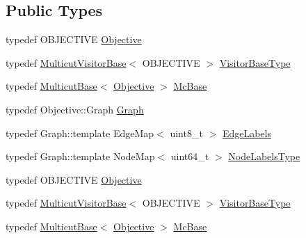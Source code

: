 \subsection*{Public Types}
\begin{DoxyCompactItemize}
\item 
typedef O\+B\+J\+E\+C\+T\+I\+V\+E \hyperlink{classnifty_1_1graph_1_1optimization_1_1multicut_1_1PyMulticutBase_a5cfc50491fd6d59375e8109cf77d832a}{Objective}
\item 
typedef \hyperlink{namespacenifty_1_1graph_1_1optimization_1_1multicut_ac347ba5e0f64a15fd2ad835dfc727b2b}{Multicut\+Visitor\+Base}$<$ O\+B\+J\+E\+C\+T\+I\+V\+E $>$ \hyperlink{classnifty_1_1graph_1_1optimization_1_1multicut_1_1PyMulticutBase_a284145d7e67237c95dde085070a89818}{Visitor\+Base\+Type}
\item 
typedef \hyperlink{classnifty_1_1graph_1_1optimization_1_1multicut_1_1MulticutBase}{Multicut\+Base}$<$ \hyperlink{classnifty_1_1graph_1_1optimization_1_1multicut_1_1PyMulticutBase_a5cfc50491fd6d59375e8109cf77d832a}{Objective} $>$ \hyperlink{classnifty_1_1graph_1_1optimization_1_1multicut_1_1PyMulticutBase_a775b6ff9bccc9e60c99fc6b42e7dd82f}{Mc\+Base}
\item 
typedef Objective\+::\+Graph \hyperlink{classnifty_1_1graph_1_1optimization_1_1multicut_1_1PyMulticutBase_a215eb2e3f8b280cebd5b3e78a9cbc490}{Graph}
\item 
typedef Graph\+::template Edge\+Map$<$ uint8\+\_\+t $>$ \hyperlink{classnifty_1_1graph_1_1optimization_1_1multicut_1_1PyMulticutBase_a2d5a888ced0b0d9a6e474a775fa23ddc}{Edge\+Labels}
\item 
typedef Graph\+::template Node\+Map$<$ uint64\+\_\+t $>$ \hyperlink{classnifty_1_1graph_1_1optimization_1_1multicut_1_1PyMulticutBase_a3fa8b01c434939d8187dc7b1515f4d81}{Node\+Labels\+Type}
\item 
typedef O\+B\+J\+E\+C\+T\+I\+V\+E \hyperlink{classnifty_1_1graph_1_1optimization_1_1multicut_1_1PyMulticutBase_a5cfc50491fd6d59375e8109cf77d832a}{Objective}
\item 
typedef \hyperlink{namespacenifty_1_1graph_1_1optimization_1_1multicut_ac347ba5e0f64a15fd2ad835dfc727b2b}{Multicut\+Visitor\+Base}$<$ O\+B\+J\+E\+C\+T\+I\+V\+E $>$ \hyperlink{classnifty_1_1graph_1_1optimization_1_1multicut_1_1PyMulticutBase_a284145d7e67237c95dde085070a89818}{Visitor\+Base\+Type}
\item 
typedef \hyperlink{classnifty_1_1graph_1_1optimization_1_1multicut_1_1MulticutBase}{Multicut\+Base}$<$ \hyperlink{classnifty_1_1graph_1_1optimization_1_1multicut_1_1PyMulticutBase_a5cfc50491fd6d59375e8109cf77d832a}{Objective} $>$ \hyperlink{classnifty_1_1graph_1_1optimization_1_1multicut_1_1PyMulticutBase_a775b6ff9bccc9e60c99fc6b42e7dd82f}{Mc\+Base}

\end{DoxyCompactItemize}
